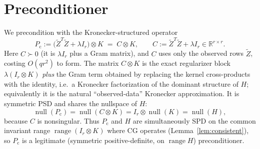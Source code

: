\documentclass[12pt]{article}
\DeclareMathOperator{\range}{range}
\DeclareMathOperator{\nullsp}{null}
\newcommand{\bR}{\mathbb{R}}
\newcommand{\tZ}{\tilde Z}
\begin{document}
\section{Preconditioner}

We precondition with the Kronecker-structured operator
\begin{equation}\label{eq:precond}
  P_{\mathrm{c}}:=\big(\tZ^{T}\tZ+\lambda I_r\big)\otimes K
  \;=\;C\otimes K,\qquad C:=\tZ^{T}\tZ+\lambda I_r\in\bR^{r\times r}.
\end{equation}
Here $C\succ0$ (it is $\lambda I_r$ plus a Gram matrix), and $C$ uses only the
observed rows $\tZ$, costing $O(qr^{2})$ to form. The matrix $C\otimes K$ is the
exact regularizer block $\lambda(I_r\otimes K)$ \emph{plus} the Gram term obtained by
replacing the kernel cross-products with the identity, i.e.\ a Kronecker
factorization of the dominant structure of $H$; equivalently it is the natural
``observed-data'' Kronecker approximation. It is symmetric PSD and shares the
nullspace of $H$:
\[
  \nullsp(P_{\mathrm{c}})=\nullsp(C\otimes K)=I_r\otimes\nullsp(K)=\nullsp(H),
\]
because $C$ is nonsingular. Thus $P_{\mathrm{c}}$ and $H$ are simultaneously SPD on
the common invariant range $\range(I_r\otimes K)$ where CG operates
(Lemma~\ref{lem:consistent}), so $P_{\mathrm{c}}$ is a legitimate
(symmetric positive-definite, on $\range H$) preconditioner.
\end{document}
